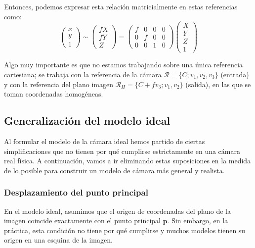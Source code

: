 \documentclass[
10pt, %
a4paper, %
oneside, %
headinclude,footinclude, %
BCOR=5mm, %
]{scrartcl}
\begin{document}
Entonces, podemos expresar esta relación matricialmente en estas referencias como:
\[
    \begin{pmatrix}
        x \\
        y \\
        1
    \end{pmatrix}
    \sim
    \begin{pmatrix}
        fX \\
        fY \\
        Z
    \end{pmatrix}
    =
    \begin{pmatrix}
        f & 0 & 0 & 0 \\
        0 & f & 0 & 0 \\
        0 & 0 & 1 & 0 
    \end{pmatrix}
    \begin{pmatrix}
        X \\
        Y \\
        Z \\
        1 
    \end{pmatrix}
\]

Algo muy importante es que no estamos trabajando sobre una única referencia cartesiana; se trabaja con la referencia de la cámara $\mathcal{R} = \{C; v_1, v_2, v_3\}$ (entrada) y con la referencia del plano imagen $\mathcal{R}_H = \{C+fv_3; v_1, v_2\}$ (salida), en las que se toman coordenadas homogéneas.

\subsection{Generalización del modelo ideal}

Al formular el modelo de la cámara ideal hemos partido de ciertas simplificaciones que no tienen por qué cumplirse estrictamente en una cámara real física. A continuación, vamos a ir eliminando estas suposiciones en la medida de lo posible para construir un modelo de cámara más general y realista.

\subsubsection{Desplazamiento del punto principal}

En el modelo ideal, asumimos que el origen de coordenadas del plano de la imagen coincide exactamente con el punto principal $\mathbf{p}$. Sin embargo, en la práctica, esta condición no tiene por qué cumplirse y muchos modelos tienen su origen en una esquina de la imagen.
\end{document}
